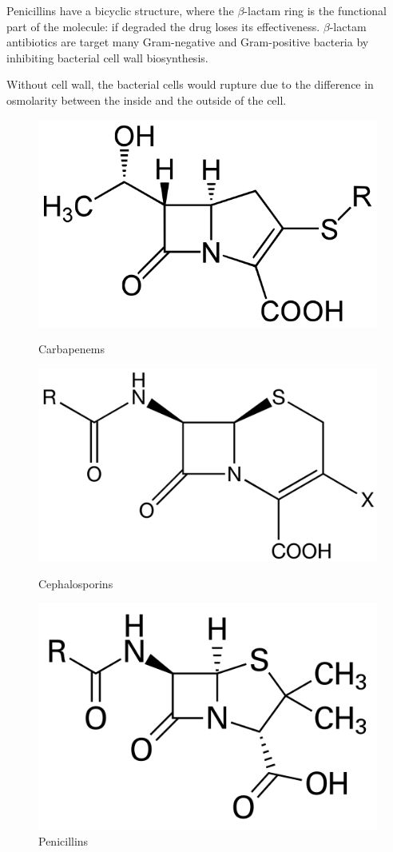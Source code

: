 \documentclass[11pt]{report}
\begin{document}
Penicillins have a bicyclic structure, where the $\beta$-lactam ring is the functional part of the molecule: if degraded the drug loses its effectiveness.
$\beta$-lactam antibiotics are target many Gram-negative and Gram-positive bacteria by inhibiting bacterial cell wall biosynthesis.

Without cell wall, the bacterial cells would rupture due to the difference in osmolarity between the inside and the outside of the cell.

\clearpage
\begin{figure}[ht]
\label{beta_lactam} 
  \noindent\begin{minipage}[b]{0.5\linewidth}
    \includegraphics[width=.5\linewidth]{img/carbapenem.png} 
    \caption*{Carbapenems} 
  \end{minipage}%
  \noindent\begin{minipage}[b]{0.5\linewidth}
    \includegraphics[width=.5\linewidth]{img/cephalosporin.png} 
    \caption*{Cephalosporins} 
  \end{minipage}
  \noindent\begin{minipage}[b]{0.5\linewidth}
    \includegraphics[width=.5\linewidth]{img/penicillin.png} 
    \caption*{Penicillins}
  \end{minipage}%
  \hfill

\end{figure}
\end{document}
